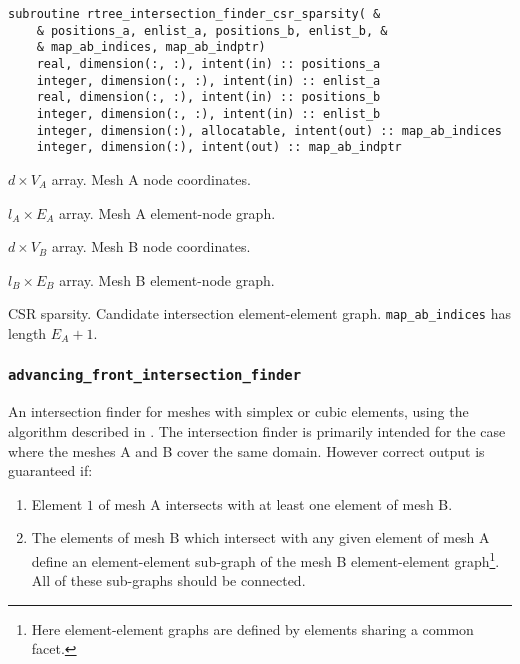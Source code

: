 \documentclass{article}
\begin{document}
\begin{lstlisting}[language=FORTRAN]
  subroutine rtree_intersection_finder_csr_sparsity( &
    & positions_a, enlist_a, positions_b, enlist_b, &
    & map_ab_indices, map_ab_indptr)
    real, dimension(:, :), intent(in) :: positions_a
    integer, dimension(:, :), intent(in) :: enlist_a
    real, dimension(:, :), intent(in) :: positions_b
    integer, dimension(:, :), intent(in) :: enlist_b
    integer, dimension(:), allocatable, intent(out) :: map_ab_indices
    integer, dimension(:), intent(out) :: map_ab_indptr
\end{lstlisting}

\begin{description}[font=\ttfamily\bfseries,leftmargin=2.2\parindent,labelindent=1.7\parindent,noitemsep]
  \item[positions\_a] $d \times V_A$ array. Mesh A node coordinates.
  \item[enlist\_a] $l_A \times E_A$ array. Mesh A element-node graph.
  \item[positions\_b] $d \times V_B$ array. Mesh B node coordinates.
  \item[enlist\_b] $l_B \times E_B$ array. Mesh B element-node graph.
  \item[map\_ab\_indices, map\_ab\_indptr] CSR sparsity. Candidate intersection
    element-element graph. \linebreak \verb+map_ab_indices+ has length
    $E_A + 1$.
\end{description}

\subsubsection{\texttt{advancing\_front\_intersection\_finder}}

An intersection finder for meshes with simplex or cubic elements, using
the algorithm described in \citet{farrell2011}
\citep[see also][]{gander2009,gander2013}. The intersection finder is primarily
intended for the case where the meshes A and B cover the same domain. However
correct output is guaranteed if:
\begin{enumerate}
  \item Element $1$ of mesh A intersects with at least one element of mesh B.
  \item The elements of mesh B which intersect with any given element of mesh A
        define an element-element sub-graph of the mesh B element-element
        graph\footnote{Here element-element graphs are defined by elements
        sharing a common facet.}. All of these sub-graphs should be connected. 
\end{enumerate}
\end{document}
